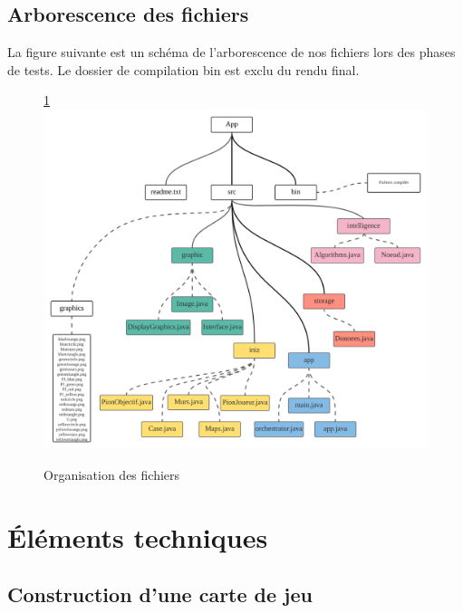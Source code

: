 \documentclass{rapportECL}
\begin{document}
\subsection{Arborescence des fichiers}
La figure suivante est un schéma de l'arborescence de nos fichiers lors des phases de tests. Le dossier de compilation bin est exclu du rendu final.
\begin{figure}[h]
    \centering
    \ref{Fig1} 
     \includegraphics[width=1\textwidth]{Graphique/Arborescence.png}
    \caption{Organisation des fichiers}
    
    \label{Fig1}    
\end{figure}

\newpage

\section{Éléments techniques}

\subsection{Construction d'une carte de jeu}
\end{document}
